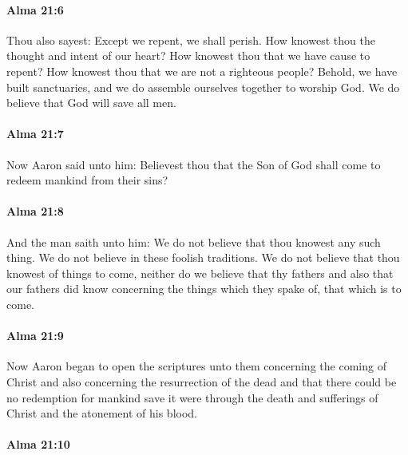 		\paragraph{Alma 21:6} %
			\label{ALMA-21-6}

			Thou also sayest:
			Except we repent, we shall perish.
			How knowest thou the thought and intent of our heart?
			How knowest thou that we have cause to repent?
			How knowest thou that we are not a righteous people?
			Behold, we have built sanctuaries,
			and we do assemble ourselves together to worship God.
			We do believe that God will save all men.

		\paragraph{Alma 21:7} %
			\label{ALMA-21-7}

			Now Aaron said unto him:
			Believest thou that the Son of God shall come to redeem mankind from their sins?

		\paragraph{Alma 21:8} %
			\label{ALMA-21-8}

			And the man saith unto him:
			We do not believe that thou knowest any such thing.
			We do not believe in these foolish traditions.
			We do not believe that thou knowest of things to come,
			neither do we believe that thy fathers and also that our fathers did know
			concerning the things which they spake of,
			that which is to come.

		\paragraph{Alma 21:9} %
			\label{ALMA-21-9}

			Now Aaron began to open the scriptures unto them
			concerning the coming of Christ and also concerning the resurrection of the dead
			and that there could be no redemption for mankind
			save it were through the death and sufferings of Christ
			and the atonement of his blood.

		\paragraph{Alma 21:10} %
			\label{ALMA-21-10}

